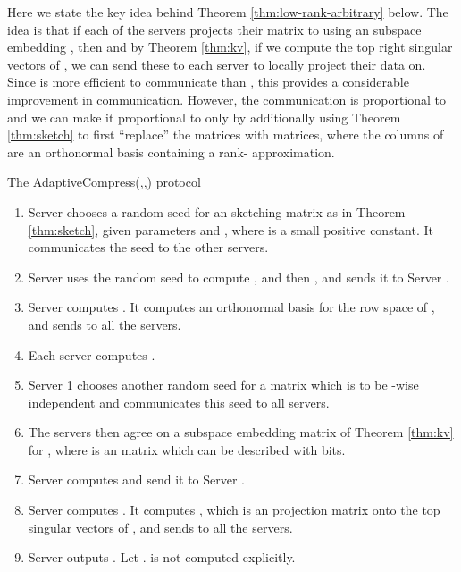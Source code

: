 \documentclass[11pt]{article}
\begin{document}
Here we state the key idea behind Theorem \ref{thm:low-rank-arbitrary} below. The idea is that
if each of the servers projects their matrix  to  using an 
subspace embedding , then  and by Theorem
\ref{thm:kv}, if we compute the top  right singular vectors of , we can send
these to each server to locally project their data on. Since  is more efficient
to communicate than , this provides a considerable improvement in communication. However,
the communication is proportional to  and we can make it proportional to only  
by additionally using Theorem \ref{thm:sketch} to first ``replace'' the  matrices
with  matrices, where the columns of  are an orthonormal basis
containing a  rank- approximation. 

\begin{algorithm}[p]
\caption{The {\sf AdaptiveCompress}(,,) protocol}
\begin{enumerate}
\item Server  chooses a random seed for an  sketching matrix  
as in Theorem \ref{thm:sketch},
given parameters  and , where  is a small positive constant.
It communicates the seed to the other servers.
\item Server  uses the random seed to compute , and then , 
and sends it to Server .
\item Server  computes . It computes an 
orthonormal basis  for the row space of , and sends  to all the servers.
\item Each server  computes . 
\item Server 1 chooses another random seed for a  matrix  
which is to be -wise independent and communicates this seed to all servers.
\item The servers then agree on a subspace embedding matrix  of Theorem \ref{thm:kv} 
for , 
where  is an  matrix which can be described with  bits.
\item Server  computes  and send it to Server .
\item Server  computes . 
It computes , which is an  projection 
matrix onto the top  singular vectors of , and sends  to all the servers.
\item Server  outputs . 
Let .  is not computed explicitly.
\end{enumerate}
\end{algorithm}
\end{document}
